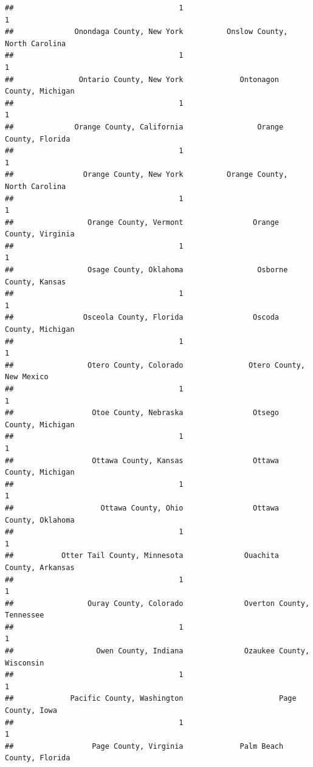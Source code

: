 \documentclass[
]{article}
\begin{document}
\begin{verbatim}
##                                      1                                      1 
##              Onondaga County, New York          Onslow County, North Carolina 
##                                      1                                      1 
##               Ontario County, New York             Ontonagon County, Michigan 
##                                      1                                      1 
##              Orange County, California                 Orange County, Florida 
##                                      1                                      1 
##                Orange County, New York          Orange County, North Carolina 
##                                      1                                      1 
##                 Orange County, Vermont                Orange County, Virginia 
##                                      1                                      1 
##                 Osage County, Oklahoma                 Osborne County, Kansas 
##                                      1                                      1 
##                Osceola County, Florida                Oscoda County, Michigan 
##                                      1                                      1 
##                 Otero County, Colorado               Otero County, New Mexico 
##                                      1                                      1 
##                  Otoe County, Nebraska                Otsego County, Michigan 
##                                      1                                      1 
##                  Ottawa County, Kansas                Ottawa County, Michigan 
##                                      1                                      1 
##                    Ottawa County, Ohio                Ottawa County, Oklahoma 
##                                      1                                      1 
##           Otter Tail County, Minnesota              Ouachita County, Arkansas 
##                                      1                                      1 
##                 Ouray County, Colorado              Overton County, Tennessee 
##                                      1                                      1 
##                   Owen County, Indiana              Ozaukee County, Wisconsin 
##                                      1                                      1 
##             Pacific County, Washington                      Page County, Iowa 
##                                      1                                      1 
##                  Page County, Virginia             Palm Beach County, Florida 

\end{verbatim}
\end{document}
